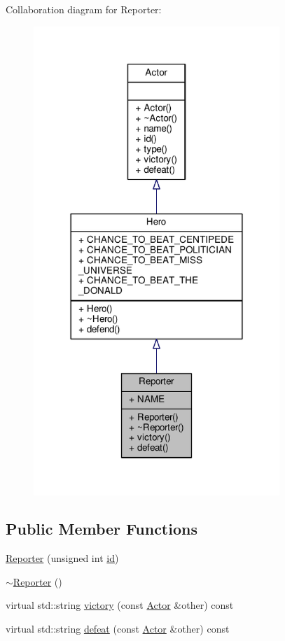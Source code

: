 Collaboration diagram for Reporter\+:
\nopagebreak
\begin{figure}[H]
\begin{center}
\leavevmode
\includegraphics[width=263pt]{classReporter__coll__graph}
\end{center}
\end{figure}
\subsection*{Public Member Functions}
\begin{DoxyCompactItemize}
\item 
\hyperlink{classReporter_a7cfd771737b90ff52c361c1c898a8b6f}{Reporter} (unsigned int \hyperlink{classActor_a084438abd4bcb9d5e17b8ad75b0f5984}{id})
\item 
\hyperlink{classReporter_acbacf4155d5fe9e4a8e833d785e76880}{$\sim$\+Reporter} ()
\item 
virtual std\+::string \hyperlink{classReporter_ac0c496d5f8f3f56c71d2afe6ab53490e}{victory} (const \hyperlink{classActor}{Actor} \&other) const 
\item 
virtual std\+::string \hyperlink{classReporter_a6147cf4ee48d5c81e72538d39c79d228}{defeat} (const \hyperlink{classActor}{Actor} \&other) const 
\end{DoxyCompactItemize}
